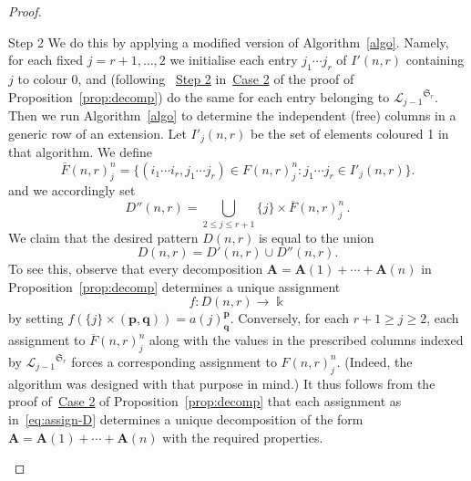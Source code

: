 \documentclass[ALCO,ThmDefs,Unicode,epreuves]{cedram}
\newcommand{\Sym}{\mathfrak{S}}
\newcommand{\ov}{\overline}
\newcommand{\bp}{{\boldsymbol{p}}}
\newcommand{\bq}{{\boldsymbol{q}}}
\newcommand{\Lin}{{\mathscr{L}}}
\newcommand{\bA}{\mathbf{A}}
\begin{document}
\begin{proof}
\begin{enonce*}[remark]{\hypertarget{prop6.13_S1}{Step 2}}
We do this by applying a modified version of Algorithm~\ref{algo}. Namely, for each fixed $j = r+1, \dots, 2$ we initialise
each entry $j_1 \cdots j_r$ of $I'(n,r)$ containing $j$ to colour 0,
and (following ~\hyperlink{Step 2}{Step 2} in~\hyperlink{Case 2}{Case 2} of the proof of Proposition~\ref{prop:decomp}) do the same for each entry belonging to
${\Lin_{j-1}}^{\Sym_r}$. Then we run Algorithm~\ref{algo} to determine
the independent (free) columns in a generic row of an extension. Let
$I'_j(n,r)$ be the set of elements coloured 1 in that algorithm. We
define
\[
\ov{F}(n,r)^n_j = \{(i_1\cdots i_r, j_1\cdots j_r) \in F(n,r)^n_j :
j_1\cdots j_r \in I'_j(n,r)\}.
\]
and we accordingly set
\[
D''(n,r) = \bigcup_{2\leq j \leq r+1} \{j\}\times
 \ov{F}(n,r)^n_j \, .
\]
We claim that the desired pattern $D(n,r)$ is equal to the union
\[
D(n,r) = D'(n,r) \cup D''(n,r).
\]
To see this, observe that every decomposition $\bA = \bA(1) +\cdots+
\bA(n)$ in Proposition~\ref{prop:decomp} determines a unique
assignment
\begin{equation}\label{eq:assign-D}
f: D(n,r) \to \Bbbk
\end{equation}
by setting $f(\{j\} \times (\bp,\bq)) = a(j)^\bp_\bq$. Conversely,
for each $r+1 \ge j \ge 2$, each assignment to $\ov{F}(n,r)^n_j$ along
with the values in the prescribed columns indexed by
${\Lin_{j-1}}^{\Sym_r}$ forces a corresponding assignment to
$F(n,r)^n_j$. (Indeed, the algorithm was designed with that purpose in
mind.) It thus follows from the proof of~\hyperlink{Case 2}{Case 2} of Proposition~\ref{prop:decomp} that each assignment as in~\eqref{eq:assign-D}
determines a unique decomposition of the form $\bA = \bA(1) +\cdots+
\bA(n)$ with the required properties.\qedhere
\end{enonce*}
\end{proof}
\end{document}
